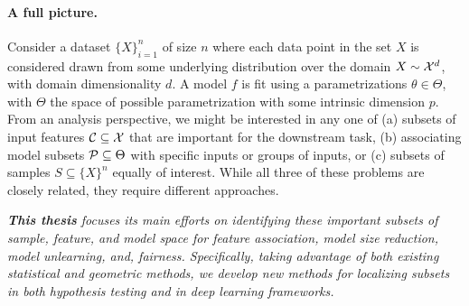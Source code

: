 \paragraph{A full picture.} Consider a dataset $\{X\}_{i=1}^n$ of size $n$ where each data point in the set $X$ is considered drawn from some underlying distribution over the domain $X \sim \mathcal{X}^d$, with domain dimensionality $d$. A model $f$ is fit using a parametrizations $\theta \in \Theta$, with $\Theta$ the space of possible parametrization with some intrinsic dimension $p$. From an analysis perspective, we might be interested in any one of (a) subsets of input features $\mathcal{C} \subseteq \mathcal{X}$ that are important for the downstream task, (b) associating model subsets $\mathcal{P} \subseteq \Theta$ with specific inputs or groups of inputs, or (c) subsets of samples $S \subseteq \{X\}^n$ equally of interest. While all three of these problems are closely related, they require different approaches. 

\begin{mdframed}[style=MyFrame]
\em 
\textbf{This thesis} focuses its main efforts on identifying these important subsets of sample, feature, and model space for feature association, model size reduction, model unlearning, and, fairness. Specifically, taking advantage of both existing statistical and geometric methods, we develop new methods for localizing subsets in both hypothesis testing and in deep learning frameworks.
\end{mdframed}

